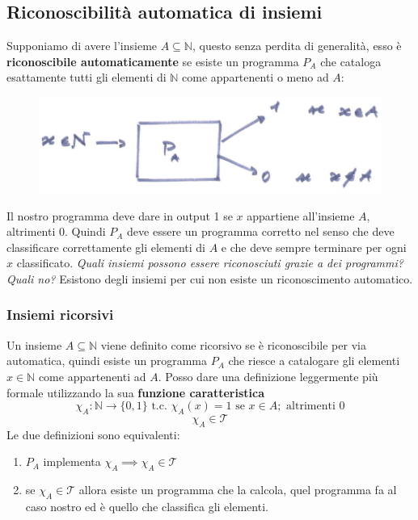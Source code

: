 \documentclass{article}
\begin{document}
\subsection{Riconoscibilità automatica di insiemi}
Supponiamo di avere l'insieme $A\subseteq\mathbb{N}$, questo senza perdita di generalità,
esso è \textbf{riconoscibile automaticamente} se esiste un programma $P_A$ che cataloga
esattamente tutti gli elementi di $\mathbb{N}$ come appartenenti o meno ad $A$:
\begin{figure}[H]
    \centering
    \includegraphics[scale=0.4]{images/insiemi_riconoscibili.png}
\end{figure}
Il nostro programma deve dare in output 1 se $x$ appartiene all'insieme $A$, altrimenti 0. Quindi
$P_A$ deve essere un programma corretto nel senso che deve classificare correttamente
gli elementi di $A$ e che deve sempre terminare per ogni $x$ classificato.
\newline\newline
\textit{Quali insiemi possono essere riconosciuti grazie a dei programmi? Quali no?} Esistono
degli insiemi per cui non esiste un riconoscimento automatico.

\subsubsection{Insiemi ricorsivi}
Un insieme $A\subseteq\mathbb{N}$ viene definito come ricorsivo se è riconoscibile per via automatica, quindi
esiste un programma $P_A$ che riesce a catalogare gli elementi $x\in\mathbb{N}$
come appartenenti ad $A$. Posso dare una definizione leggermente più formale utilizzando
la sua \textbf{funzione caratteristica}
$$\chi_A:\mathbb{N}\rightarrow\{0,1\}\text{ t.c. }\chi_A(x)=1\text{ se }x\in A;\text{ altrimenti }0$$
$$\chi_A\in\mathcal{T}$$
Le due definizioni sono equivalenti:
\begin{enumerate}
    \item $P_A$ implementa $\chi_A\implies \chi_A\in\mathcal{T}$
    \item se $\chi_A\in\mathcal{T}$ allora esiste un programma che la calcola,
          quel programma fa al caso nostro ed è quello che classifica gli elementi.
\end{enumerate}
\end{document}
